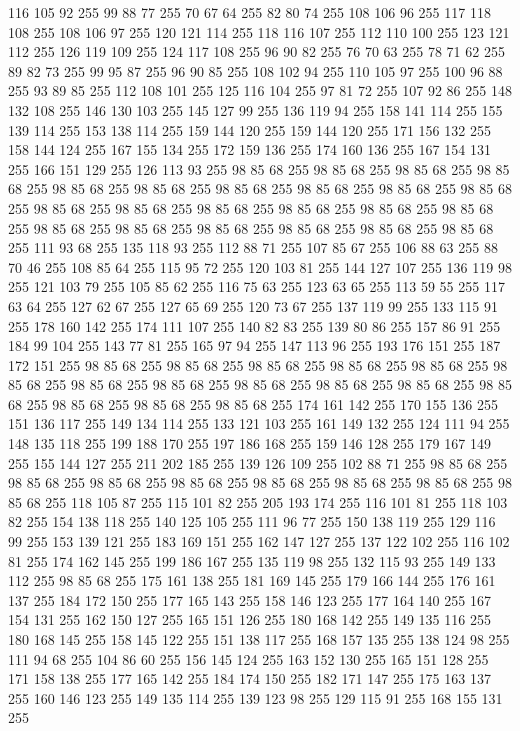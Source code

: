 116 105 92 255 99 88 77 255 70 67 64 255 82 80 74 255 108 106 96 255 117 118 108 255 108 106 97 255 120 121 114 255 118 116 107 255 112 110 100 255 123 121 112 255 126 119 109 255 124 117 108 255 96 90 82 255 76 70 63 255 78 71 62 255 89 82 73 255 99 95 87 255 96 90 85 255 108 102 94 255 110 105 97 255 100 96 88 255 93 89 85 255 112 108 101 255 125 116 104 255 97 81 72 255 107 92 86 255 148 132 108 255 146 130 103 255 145 127 99 255 136 119 94 255 158 141 114 255 155 139 114 255 153 138 114 255 159 144 120 255 159 144 120 255 171 156 132 255 158 144 124 255 167 155 134 255 172 159 136 255 174 160 136 255 167 154 131 255 166 151 129 255 126 113 93 255 98 85 68 255 98 85 68 255 98 85 68 255 98 85 68 255 98 85 68 255 98 85 68 255 98 85 68 255 98 85 68 255 98 85 68 255 98 85 68 255 98 85 68 255 98 85 68 255 98 85 68 255 98 85 68 255 98 85 68 255 98 85 68 255 98 85 68 255 98 85 68 255 98 85 68 255 98 85 68 255
98 85 68 255 98 85 68 255 111 93 68 255 135 118 93 255 112 88 71 255 107 85 67 255 106 88 63 255 88 70 46 255 108 85 64 255 115 95 72 255 120 103 81 255 144 127 107 255 136 119 98 255 121 103 79 255 105 85 62 255 116 75 63 255 123 63 65 255 113 59 55 255 117 63 64 255 127 62 67 255 127 65 69 255 120 73 67 255 137 119 99 255 133 115 91 255 178 160 142 255 174 111 107 255 140 82 83 255 139 80 86 255 157 86 91 255 184 99 104 255 143 77 81 255 165 97 94 255 147 113 96 255 193 176 151 255 187 172 151 255 98 85 68 255 98 85 68 255 98 85 68 255 98 85 68 255 98 85 68 255 98 85 68 255 98 85 68 255 98 85 68 255 98 85 68 255 98 85 68 255 98 85 68 255 98 85 68 255 98 85 68 255 98 85 68 255 98 85 68 255 174 161 142 255 170 155 136 255 151 136 117 255 149 134 114 255 133 121 103 255 161 149 132 255 124 111 94 255 148 135 118 255 199 188 170 255 197 186 168 255 159 146 128 255 179 167 149 255 155 144 127 255 211 202 185 255
139 126 109 255 102 88 71 255 98 85 68 255 98 85 68 255 98 85 68 255 98 85 68 255 98 85 68 255 98 85 68 255 98 85 68 255 98 85 68 255 118 105 87 255 115 101 82 255 205 193 174 255 116 101 81 255 118 103 82 255 154 138 118 255 140 125 105 255 111 96 77 255 150 138 119 255 129 116 99 255 153 139 121 255 183 169 151 255 162 147 127 255 137 122 102 255 116 102 81 255 174 162 145 255 199 186 167 255 135 119 98 255 132 115 93 255 149 133 112 255 98 85 68 255 175 161 138 255 181 169 145 255 179 166 144 255 176 161 137 255 184 172 150 255 177 165 143 255 158 146 123 255 177 164 140 255 167 154 131 255 162 150 127 255 165 151 126 255 180 168 142 255 149 135 116 255 180 168 145 255 158 145 122 255 151 138 117 255 168 157 135 255 138 124 98 255 111 94 68 255 104 86 60 255 156 145 124 255 163 152 130 255 165 151 128 255 171 158 138 255 177 165 142 255 184 174 150 255 182 171 147 255 175 163 137 255 160 146 123 255 149 135 114 255 139 123 98 255 129 115 91 255 168 155 131 255
